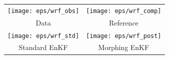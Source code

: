 \documentclass{beamer}
\begin{document}
\begin{frame}
\vspace{-.1in}
\begin{figure}[t!]
\begin{center}%
\begin{tabular}
[c]{cc}%
\texttt{[image: eps/wrf\_obs]}  &
\texttt{[image: eps/wrf\_comp]}\\
Data&Reference\\
\texttt{[image: eps/wrf\_std]} &
\texttt{[image: eps/wrf\_post]}\\
Standard EnKF&Morphing EnKF
\end{tabular}
\newline
\end{center}

\end{figure}

\end{frame}
\end{document}
